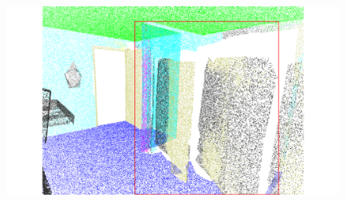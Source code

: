 \begin{figure}[htbp]
\begin{minipage}{0.22\textwidth}
    \end{minipage}
    \hfill
    \begin{minipage}{0.22\textwidth}
        \centering
        \includegraphics[width=\textwidth]{fig/supplement/semantic_segmentation/wc_2/DAPT_wc_2.pdf}
    \end{minipage}
    \hfill

    \vspace{0.5em}


\end{figure}
